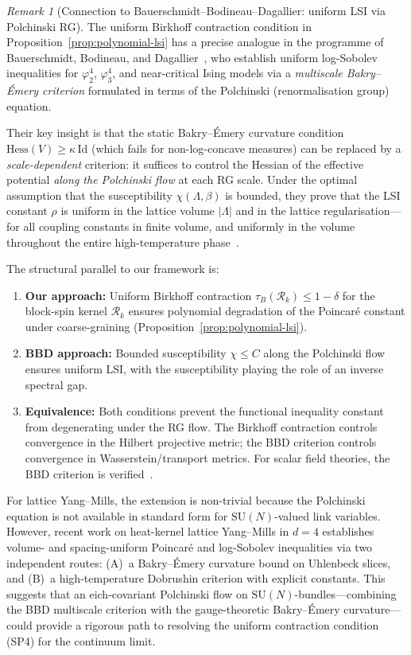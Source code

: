 \documentclass[12pt,a4paper]{article}
\theoremstyle{definition}
\theoremstyle{plain}
\theoremstyle{remark}
\newtheorem{remark}[definition]{Remark}
\begin{document}
\begin{remark}[Connection to Bauerschmidt--Bodineau--Dagallier: uniform LSI via Polchinski RG]
\label{rem:bbd-polchinski}
The uniform Birkhoff contraction condition in Proposition~\ref{prop:polynomial-lsi} has a precise analogue in the programme of Bauerschmidt, Bodineau, and Dagallier~\cite{BBD-Survey2024,BBD-Ising2024,BBD-Phi4-2024}, who establish uniform log-Sobolev inequalities for $\varphi^4_2$, $\varphi^4_3$, and near-critical Ising models via a \emph{multiscale Bakry--\'Emery criterion} formulated in terms of the Polchinski (renormalisation group) equation.

Their key insight is that the static Bakry--\'Emery curvature condition $\mathrm{Hess}(V) \geq \kappa\,\mathrm{Id}$ (which fails for non-log-concave measures) can be replaced by a \emph{scale-dependent} criterion: it suffices to control the Hessian of the effective potential \emph{along the Polchinski flow} at each RG scale. Under the optimal assumption that the susceptibility $\chi(\Lambda, \beta)$ is bounded, they prove that the LSI constant $\rho$ is uniform in the lattice volume $|\Lambda|$ and in the lattice regularisation---for all coupling constants in finite volume, and uniformly in the volume throughout the entire high-temperature phase~\cite{BBD-Phi4-2024}.

The structural parallel to our framework is:
\begin{enumerate}
    \item \textbf{Our approach:} Uniform Birkhoff contraction $\tau_B(\mathcal{R}_k) \leq 1 - \delta$ for the block-spin kernel $\mathcal{R}_k$ ensures polynomial degradation of the Poincar\'e constant under coarse-graining (Proposition~\ref{prop:polynomial-lsi}).
    \item \textbf{BBD approach:} Bounded susceptibility $\chi \leq C$ along the Polchinski flow ensures uniform LSI, with the susceptibility playing the role of an inverse spectral gap.
    \item \textbf{Equivalence:} Both conditions prevent the functional inequality constant from degenerating under the RG flow. The Birkhoff contraction controls convergence in the Hilbert projective metric; the BBD criterion controls convergence in Wasserstein/transport metrics. For scalar field theories, the BBD criterion is verified~\cite{BBD-Phi4-2024}.
\end{enumerate}

For lattice Yang--Mills, the extension is non-trivial because the Polchinski equation is not available in standard form for $\mathrm{SU}(N)$-valued link variables. However, recent work on heat-kernel lattice Yang--Mills in $d=4$ establishes volume- and spacing-uniform Poincar\'e and log-Sobolev inequalities via two independent routes: (A)~a Bakry--\'Emery curvature bound on Uhlenbeck slices, and (B)~a high-temperature Dobrushin criterion with explicit constants. This suggests that an eich-covariant Polchinski flow on $\mathrm{SU}(N)$-bundles---combining the BBD multiscale criterion with the gauge-theoretic Bakry--\'Emery curvature---could provide a rigorous path to resolving the uniform contraction condition (SP4) for the continuum limit.


\end{remark}
\end{document}

